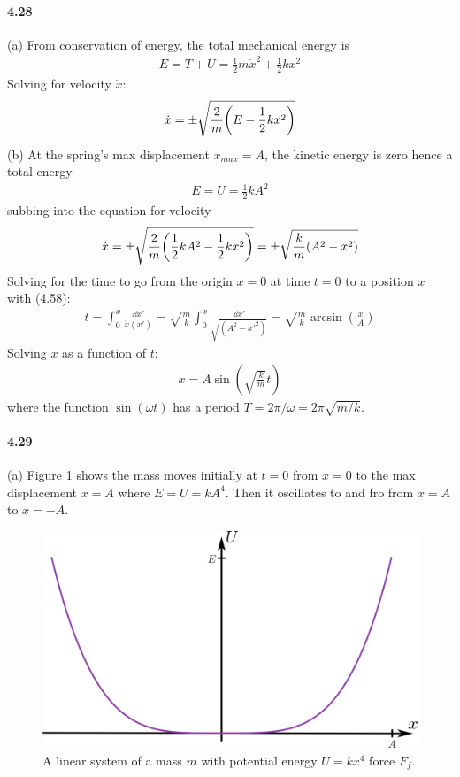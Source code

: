 \documentclass[../problems.tex]{subfiles}
\begin{document}
\paragraph{4.28}
(a) From conservation of energy, the total mechanical energy is
\begin{align*}
    E = T + U = \frac{1}{2} m \dot{x}^2 + \frac{1}{2} k x^2
\end{align*}
Solving for velocity $\dot{x}$:
\begin{align*}
    \dot{x} = \pm \sqrt{\frac{2}{m} \quantity(E - \frac{1}{2} k x^2)}
\end{align*}
(b) At the spring's max displacement $x_{max} = A$, the kinetic energy is zero hence a total energy
\begin{align*}
    E = U = \frac{1}{2} k A^2
\end{align*}
subbing into the equation for velocity
\begin{align*}
    \dot{x} = \pm \sqrt{\frac{2}{m} \quantity(\frac{1}{2} k A^2 - \frac{1}{2} k x^2)}
    = \pm \sqrt{\frac{k}{m} \quantity(A^2 - x^2)}
\end{align*}
Solving for the time to go from the origin $x=0$ at time $t=0$ to a position $x$ with (4.58):
\begin{align*}
    t = \int_0^x \frac{\dd{x'}}{\dot{x}(x')} 
    = \sqrt{\frac{m}{k}} \int_0^x \frac{\dd{x'}}{\sqrt{(A^2 - x'^2)}}
    = \sqrt{\frac{m}{k}} \arcsin(\frac{x}{A})
\end{align*}
Solving $x$ as a function of $t$:
\begin{align*}
    x = A \sin(\sqrt{\frac{k}{m}} t)
\end{align*}
where the function $\sin(\omega t)$ has a period $T = 2\pi / \omega = 2\pi \sqrt{m/k}$.

\paragraph{4.29}
(a) Figure \ref{fig:4_29} shows the mass moves initially at $t=0$ from $x=0$ to the max displacement
$x=A$ where $E = U = kA^4$. Then it oscillates to and fro from $x=A$ to $x=-A$.
\begin{figure} [ht] 
    \centering
    \includegraphics[scale=0.7]{../images/fig4_29.png}
    \caption{A linear system of a mass $m$ with potential energy $U = kx^4$
    force $F_f$.}
    \label{fig:4_29}
\end{figure}
\end{document}
